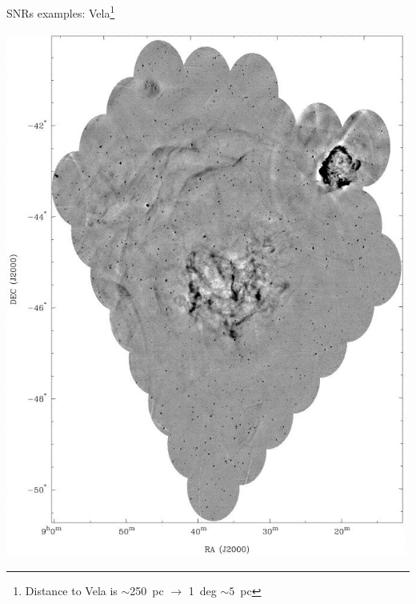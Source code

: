 \begin{frame}{SNRs examples:
  Vela\footnote{Distance to Vela is $\sim$250~pc $\rightarrow$ 1~deg
    $\sim 5$~pc }}
\begin{minipage}[t]{0.59\textwidth}
\begin{center}
 \includegraphics[width=0.99\textwidth,height=!]{./E/vela_large_843MHz.jpg}
\end{center}
\end{minipage}

\end{frame}







